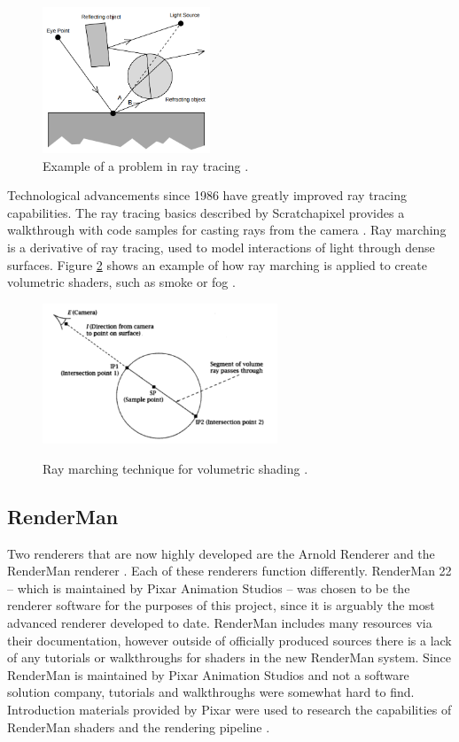 \documentclass[conference]{IEEEtran}
\begin{document}
\begin{figure}[htbp]
\centerline{\includegraphics[width=5cm]{raytrace.png}}
\caption{Example of a problem in ray tracing \cite{backwards_raytrace}.}
\label{fig:raytrace}
\end{figure}

Technological advancements since 1986 have greatly improved ray tracing capabilities.
The ray tracing basics described by Scratchapixel 
provides a walkthrough with code samples for casting rays from the camera
\cite{raytrace_walkthrough}.
Ray marching is a derivative of ray tracing, used to model interactions of light through
dense surfaces.
Figure \ref{fig:ray_marching} shows an example of how ray marching is applied to
create volumetric shaders, such as smoke or fog \cite{ray_marching}.

\begin{figure}[htbp]
\centering
{\includegraphics[width=7cm]{ray_marching.png}}
\caption{Ray marching technique for volumetric shading \cite{ray_marching}.}
\label{fig:ray_marching}
\end{figure}

\subsection{RenderMan}
Two renderers that are now highly developed are the Arnold Renderer \cite{arnold}
and the RenderMan renderer \cite{renderman_docs}. Each of these renderers
function differently.
RenderMan 22 -- which is maintained by Pixar Animation Studios --
was chosen to be the renderer software for the purposes of this project,
since it is arguably the most advanced renderer developed to date.
RenderMan includes many resources via their documentation,
however outside of officially produced sources there is a lack of any tutorials or
walkthroughs for shaders in the new RenderMan system.
Since RenderMan is maintained by Pixar Animation Studios and not a software solution
company, tutorials and walkthroughs were somewhat hard to find.
Introduction materials provided by Pixar were used to research the capabilities
of RenderMan shaders and the rendering pipeline \cite{renderman}.
\end{document}
